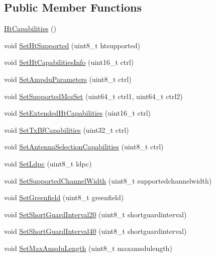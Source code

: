 \subsection*{Public Member Functions}
\begin{DoxyCompactItemize}
\item 
\hyperlink{classns3_1_1HtCapabilities_aa5fbb4d4d8e3553d8b75da142075c79b}{Ht\+Capabilities} ()
\item 
void \hyperlink{classns3_1_1HtCapabilities_a2ad1fa9522ca436581c33aa8a907463c}{Set\+Ht\+Supported} (uint8\+\_\+t htsupported)
\item 
void \hyperlink{classns3_1_1HtCapabilities_a769fb06a27105920bcff5dbe18dc26b9}{Set\+Ht\+Capabilities\+Info} (uint16\+\_\+t ctrl)
\item 
void \hyperlink{classns3_1_1HtCapabilities_a1cbe7ed15b6cc009224c15c13ef306b7}{Set\+Ampdu\+Parameters} (uint8\+\_\+t ctrl)
\item 
void \hyperlink{classns3_1_1HtCapabilities_a46e145e3c524a873f3697386e6163785}{Set\+Supported\+Mcs\+Set} (uint64\+\_\+t ctrl1, uint64\+\_\+t ctrl2)
\item 
void \hyperlink{classns3_1_1HtCapabilities_a1c2d0beff5b9136175b167515702d387}{Set\+Extended\+Ht\+Capabilities} (uint16\+\_\+t ctrl)
\item 
void \hyperlink{classns3_1_1HtCapabilities_a55410b1cd30f06e200dbc882e6b43378}{Set\+Tx\+Bf\+Capabilities} (uint32\+\_\+t ctrl)
\item 
void \hyperlink{classns3_1_1HtCapabilities_a4089775ec9c61da5e70e1c0885bb75ea}{Set\+Antenna\+Selection\+Capabilities} (uint8\+\_\+t ctrl)
\item 
void \hyperlink{classns3_1_1HtCapabilities_a045058b2e13cc526ff123fcda1ad8aef}{Set\+Ldpc} (uint8\+\_\+t ldpc)
\item 
void \hyperlink{classns3_1_1HtCapabilities_a06f115e8a9cd41b476bf031476c57c09}{Set\+Supported\+Channel\+Width} (uint8\+\_\+t supportedchannelwidth)
\item 
void \hyperlink{classns3_1_1HtCapabilities_adf0794c6d9e20322d283c3949b00f051}{Set\+Greenfield} (uint8\+\_\+t greenfield)
\item 
void \hyperlink{classns3_1_1HtCapabilities_a1bc6ff98e7876dadf5af240c32ddca7f}{Set\+Short\+Guard\+Interval20} (uint8\+\_\+t shortguardinterval)
\item 
void \hyperlink{classns3_1_1HtCapabilities_ac44aaaf937496cbd0ddffe3b500d4c12}{Set\+Short\+Guard\+Interval40} (uint8\+\_\+t shortguardinterval)
\item 
void \hyperlink{classns3_1_1HtCapabilities_afbb3840dcb2e76e3462fd2dac25b7681}{Set\+Max\+Amsdu\+Length} (uint8\+\_\+t maxamsdulength)

\end{DoxyCompactItemize}
